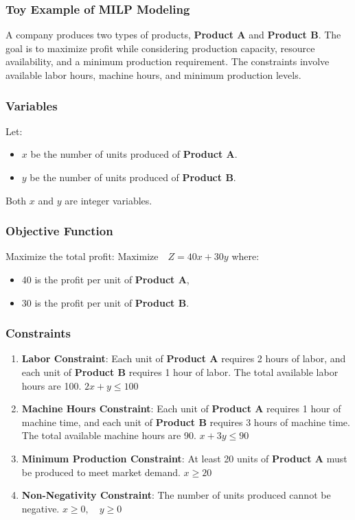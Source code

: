 \subsubsection{Toy Example of MILP Modeling}

A company produces two types of products, \textbf{Product A} and \textbf{Product B}. The goal is to maximize profit while considering production capacity, resource availability, and a minimum production requirement. The constraints involve available labor hours, machine hours, and minimum production levels.

\subsubsection{Variables}
Let:
\begin{itemize}
    \item $x$ be the number of units produced of \textbf{Product A}.
    \item $y$ be the number of units produced of \textbf{Product B}.
\end{itemize}

Both $x$ and $y$ are integer variables.

\subsubsection{Objective Function}
Maximize the total profit:
$
\text{Maximize} \quad Z = 40x + 30y
$
where:
\begin{itemize}
    \item 40 is the profit per unit of \textbf{Product A},
    \item 30 is the profit per unit of \textbf{Product B}.
\end{itemize}

\subsubsection{Constraints}
\begin{enumerate}
    \item \textbf{Labor Constraint}: Each unit of \textbf{Product A} requires 2 hours of labor, and each unit of \textbf{Product B} requires 1 hour of labor. The total available labor hours are 100.
    $
    2x + y \leq 100
    $
    
    \item \textbf{Machine Hours Constraint}: Each unit of \textbf{Product A} requires 1 hour of machine time, and each unit of \textbf{Product B} requires 3 hours of machine time. The total available machine hours are 90.
    $
    x + 3y \leq 90
    $
    
    \item \textbf{Minimum Production Constraint}: At least 20 units of \textbf{Product A} must be produced to meet market demand.
    $
    x \geq 20
    $
    
    \item \textbf{Non-Negativity Constraint}: The number of units produced cannot be negative.
    $
    x \geq 0, \quad y \geq 0
    $
\end{enumerate}

